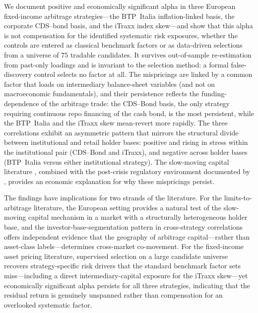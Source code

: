 We document positive and economically significant alpha in three
European fixed-income arbitrage strategies---the BTP~Italia
inflation-linked basis, the corporate CDS--bond basis, and the
iTraxx index skew---and show that this alpha is not compensation for
the identified systematic risk exposures, whether the controls are
entered as classical benchmark factors or as data-driven selections
from a universe of $75$ tradable candidates. It survives out-of-sample re-estimation from past-only loadings
and is invariant to the selection method: a formal false-discovery
control selects no factor at all. The mispricings are
linked by a common factor that loads on intermediary balance-sheet
variables (and not on macroeconomic fundamentals), and their
persistence reflects the
funding-dependence of the arbitrage trade: the CDS--Bond basis,
the only strategy requiring continuous repo financing of the cash
bond, is the most persistent, while the BTP~Italia and the iTraxx
skew mean-revert more rapidly. The three correlations exhibit an
asymmetric pattern that mirrors the structural divide between
institutional and retail holder bases: positive and rising in stress
within the institutional pair (CDS--Bond and iTraxx), and negative
across holder bases (BTP~Italia versus either institutional
strategy). The slow-moving capital literature
\citep{duffie2010presidential, brunnermeier2009market,
mitchell2012arbitrage}, combined with the post-crisis regulatory
environment documented by \citet{boyarchenko2016trends}, provides
an economic explanation for why these mispricings persist.

The findings have implications for two strands of the literature.
For the limits-to-arbitrage literature, the European setting
provides a natural test of the slow-moving capital mechanism in a
market with a structurally heterogeneous holder base, and the
investor-base-segmentation pattern in cross-strategy correlations
offers independent evidence that the geography of arbitrage
capital---rather than asset-class labels---determines cross-market
co-movement. For the fixed-income asset pricing literature,
supervised selection on a large candidate universe recovers
strategy-specific risk drivers that the standard benchmark factor
sets miss---including a direct intermediary-capital exposure for the
iTraxx skew---yet economically significant alpha persists for all
three strategies, indicating that the residual return is genuinely
unspanned rather than compensation for an overlooked systematic
factor.